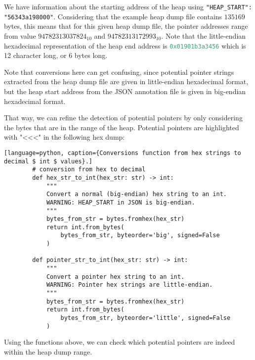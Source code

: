     We have information about the starting address of the heap using \lstinline[style=json]!"HEAP_START": "56343a198000"!. Considering that the example heap dump file contains $ 135169 $ bytes, this means that for this given heap dump file, the pointer addresses range from value $ 94782313037824_{10} $ and $ 94782313172993_{10} $. Note that the little-endian hexadecimal representation of the heap end address is \lstinline[language=c]!0x01901b3a3456! which is 12 character long, or 6 bytes long.

    Note that conversions here can get confusing, since potential pointer strings extracted from the heap dump file are given in little-endian hexadecimal format, but the heap start address from the JSON annotation file is given in big-endian hexadecimal format.

    \begin{minipage}{\dimexpr\linewidth-20pt}
        That way, we can refine the detection of potential pointers by only considering the bytes that are in the range of the heap. Potential pointers are highlighted with "<<<" in the following hex dump:

        \begin{lstlisting}[language=python, caption={Conversions function from hex strings to decimal $ int $ values}.]
        # conversion from hex to decimal
        def hex_str_to_int(hex_str: str) -> int:
            """
            Convert a normal (big-endian) hex string to an int.
            WARNING: HEAP_START in JSON is big-endian.
            """
            bytes_from_str = bytes.fromhex(hex_str)
            return int.from_bytes(
                bytes_from_str, byteorder='big', signed=False
            )
        
        def pointer_str_to_int(hex_str: str) -> int:
            """
            Convert a pointer hex string to an int.
            WARNING: Pointer hex strings are little-endian.
            """
            bytes_from_str = bytes.fromhex(hex_str)
            return int.from_bytes(
                bytes_from_str, byteorder='little', signed=False
            )
        \end{lstlisting}
    \end{minipage}

    Using the functions above, we can check which potential pointers are indeed within the heap dump range.

